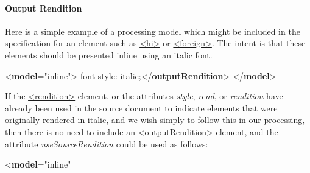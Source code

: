 \paragraph[{Output Rendition }]{Output Rendition }\label{TDPMOR}\par
Here is a simple example of a processing model which might be included in the specification for an element such as \hyperref[TEI.hi]{<hi>} or \hyperref[TEI.foreign]{<foreign>}. The intent is that these elements should be presented inline using an italic font. \par\bgroup{}\exampleFont \begin{shaded}\noindent\mbox{}{<\textbf{model}\hspace*{1em}{behaviour}="{inline}">}\mbox{}\newline 
{}font-style: italic;{</\textbf{outputRendition}>}\mbox{}\newline 
{</\textbf{model}>}\end{shaded}\egroup\par \noindent  If the \hyperref[TEI.rendition]{<rendition>} element, or the attributes {\itshape style}, {\itshape rend}, or {\itshape rendition} have already been used in the source document to indicate elements that were originally rendered in italic, and we wish simply to follow this in our processing, then there is no need to include an \hyperref[TEI.outputRendition]{<outputRendition>} element, and the attribute {\itshape useSourceRendition} could be used as follows: \par\bgroup{}\exampleFont \begin{shaded}\noindent\mbox{}{<\textbf{model}\hspace*{1em}{behaviour}="{inline}"\mbox{}\newline 
}
\end{shaded}
